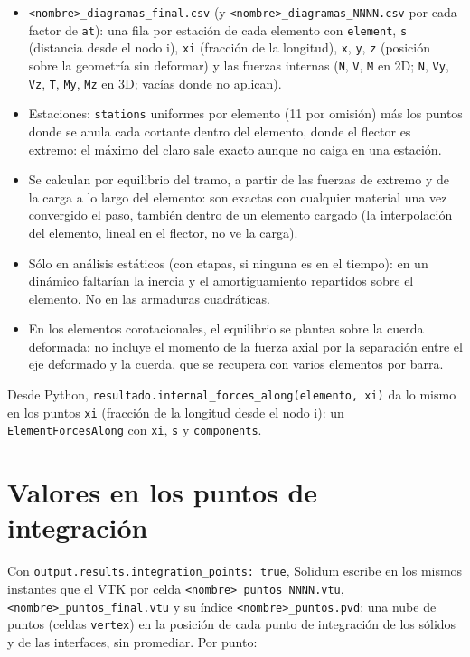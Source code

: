 \documentclass[11pt,oneside]{report}
\begin{document}
\begin{itemize}
  \item \texttt{\textless{}nombre\textgreater{}\_\allowbreak{}diagramas\_\allowbreak{}final.\allowbreak{}csv} (y \texttt{\textless{}nombre\textgreater{}\_\allowbreak{}diagramas\_\allowbreak{}NNNN.\allowbreak{}csv} por cada factor de \texttt{at}): una fila por estación de cada elemento con \texttt{element}, \texttt{s} (distancia desde el nodo i), \texttt{xi} (fracción de la longitud), \texttt{x}, \texttt{y}, \texttt{z} (posición sobre la geometría sin deformar) y las fuerzas internas (\texttt{N}, \texttt{V}, \texttt{M} en 2D; \texttt{N}, \texttt{Vy}, \texttt{Vz}, \texttt{T}, \texttt{My}, \texttt{Mz} en 3D; vacías donde no aplican).
  \item Estaciones: \texttt{stations} uniformes por elemento (11 por omisión) más los puntos donde se anula cada cortante dentro del elemento, donde el flector es extremo: el máximo del claro sale exacto aunque no caiga en una estación.
  \item Se calculan por equilibrio del tramo, a partir de las fuerzas de extremo y de la carga a lo largo del elemento: son exactas con cualquier material una vez convergido el paso, también dentro de un elemento cargado (la interpolación del elemento, lineal en el flector, no ve la carga).
  \item Sólo en análisis estáticos (con etapas, si ninguna es en el tiempo): en un dinámico faltarían la inercia y el amortiguamiento repartidos sobre el elemento. No en las armaduras cuadráticas.
  \item En los elementos corotacionales, el equilibrio se plantea sobre la cuerda deformada: no incluye el momento de la fuerza axial por la separación entre el eje deformado y la cuerda, que se recupera con varios elementos por barra.
\end{itemize}

Desde Python, \texttt{resultado.\allowbreak{}internal\_\allowbreak{}forces\_\allowbreak{}along(elemento, xi)} da lo mismo en los puntos \texttt{xi} (fracción de la longitud desde el nodo i): un \texttt{ElementForcesAlong} con \texttt{xi}, \texttt{s} y \texttt{components}.

\section{Valores en los puntos de integración}

Con \texttt{output.\allowbreak{}results.\allowbreak{}integration\_\allowbreak{}points: true}, Solidum escribe en los mismos instantes que el VTK por celda \texttt{\textless{}nombre\textgreater{}\_\allowbreak{}puntos\_\allowbreak{}NNNN.\allowbreak{}vtu}, \texttt{\textless{}nombre\textgreater{}\_\allowbreak{}puntos\_\allowbreak{}final.\allowbreak{}vtu} y su índice \texttt{\textless{}nombre\textgreater{}\_\allowbreak{}puntos.\allowbreak{}pvd}: una nube de puntos (celdas \texttt{vertex}) en la posición de cada punto de integración de los sólidos y de las interfaces, sin promediar. Por punto:
\end{document}
